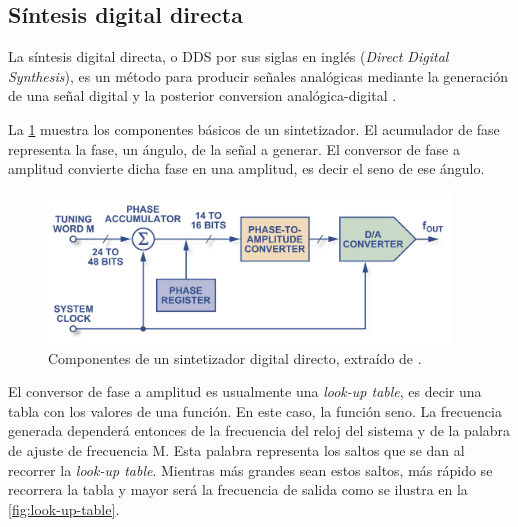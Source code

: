 \documentclass{article}
\newenvironment{standalone}{\begin{preview}}{\end{preview}}
\begin{document}
\begin{standalone}
  \subsection{Síntesis digital directa} \label{subsec:dds}

  La síntesis digital directa, o DDS por sus siglas en inglés (\textit{Direct Digital Synthesis}), es un método para producir señales analógicas mediante la generación de una señal digital y la posterior conversion analógica-digital \cite{murphy2004}.

  La \cref{fig:componentes-dds} muestra los componentes básicos de un sintetizador.
  El acumulador de fase representa la fase, un ángulo, de la señal a generar.
  El conversor de fase a amplitud convierte dicha fase en una amplitud, es decir el seno de ese ángulo.

  \begin{figure}[!htbp]
    \centering
    \includegraphics[width=\linewidth, height=40mm, keepaspectratio]{../images/componentes-dds.jpg}
    \caption{Componentes de un sintetizador digital directo, extraído de \cite{murphy2004}.}
    \label{fig:componentes-dds}
  \end{figure}

  El conversor de fase a amplitud es usualmente una \textit{look-up table}, es decir una tabla con los valores de una función.
  En este caso, la función seno.
  La frecuencia generada dependerá entonces de la frecuencia del reloj del sistema y de la palabra de ajuste de frecuencia M.
  Esta palabra representa los saltos que se dan al recorrer la \textit{look-up table}.
  Mientras más grandes sean estos saltos, más rápido se recorrera la tabla y mayor será la frecuencia de salida como se ilustra en la \cref{fig:look-up-table}.


\end{standalone}
\end{document}
